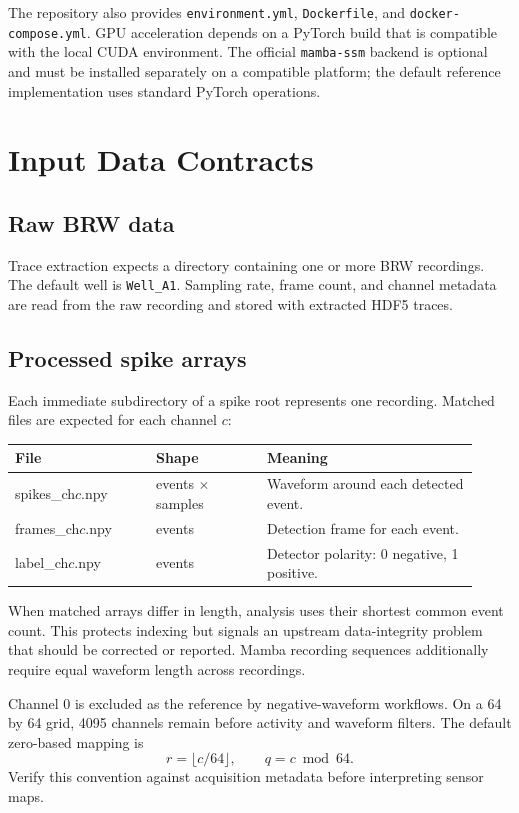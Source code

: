 \documentclass[11pt,a4paper]{article}
\newcommand{\code}[1]{\texttt{#1}}
\begin{document}
The repository also provides \code{environment.yml}, \code{Dockerfile}, and
\code{docker-compose.yml}. GPU acceleration depends on a PyTorch build that is
compatible with the local CUDA environment. The official \code{mamba-ssm}
backend is optional and must be installed separately on a compatible platform;
the default reference implementation uses standard PyTorch operations.

\section{Input Data Contracts}

\subsection{Raw BRW data}

Trace extraction expects a directory containing one or more BRW recordings.
The default well is \code{Well\_A1}. Sampling rate, frame count, and channel
metadata are read from the raw recording and stored with extracted HDF5 traces.

\subsection{Processed spike arrays}

Each immediate subdirectory of a spike root represents one recording. Matched
files are expected for each channel \(c\):

\begin{longtable}{>{\ttfamily}p{0.28\linewidth}p{0.22\linewidth}p{0.42\linewidth}}
\toprule
File & Shape & Meaning \\
\midrule
spikes\_ch\(c\).npy & events \(\times\) samples & Waveform around each detected event. \\
frames\_ch\(c\).npy & events & Detection frame for each event. \\
label\_ch\(c\).npy & events & Detector polarity: 0 negative, 1 positive. \\
\bottomrule
\end{longtable}

When matched arrays differ in length, analysis uses their shortest common event
count. This protects indexing but signals an upstream data-integrity problem
that should be corrected or reported. Mamba recording sequences additionally
require equal waveform length across recordings.

Channel 0 is excluded as the reference by negative-waveform workflows. On a
64 by 64 grid, 4095 channels remain before activity and waveform filters. The
default zero-based mapping is
\[
  r = \lfloor c/64 \rfloor, \qquad q = c \bmod 64.
\]
Verify this convention against acquisition metadata before interpreting sensor
maps.
\end{document}

